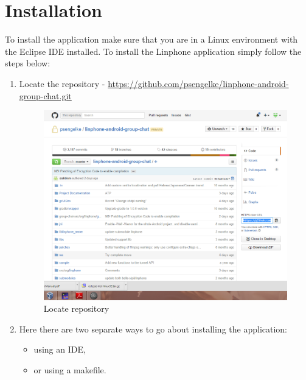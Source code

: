 \documentclass[11pt]{article}
\begin{document}
\newpage
\section{Installation}
To install the application make sure that you are in a Linux environment with the Eclipse IDE installed.
To install the Linphone application simply follow the steps below:
\begin{enumerate}
\item Locate the repository - \url{https://github.com/psengelke/linphone-android-group-chat.git}
\begin{figure}[H]
\centering
\includegraphics[width=5in]{./images/repoLocate.png}
\caption{Locate repository}
\label{repoLocate}
\end{figure}
\item Here there are two separate ways to go about installing the application: 
\begin{itemize}
\item using an IDE,
\item or using a makefile. 
\end{itemize}
\end{enumerate}
\end{document}
